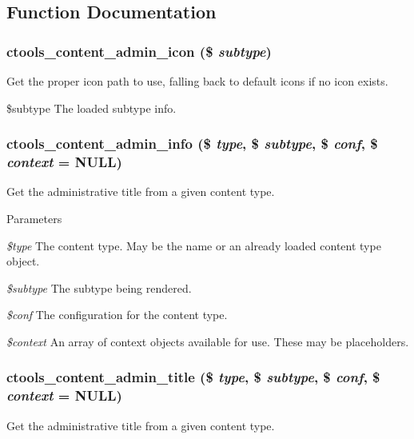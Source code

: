\subsection{Function Documentation}
\hypertarget{content_8inc_a8a34ea697f0793ce3d937ad6e80970ef}{
\subsubsection[{ctools\_\-content\_\-admin\_\-icon}]{\setlength{\rightskip}{0pt plus 5cm}ctools\_\-content\_\-admin\_\-icon (\$ {\em subtype})}}
\label{content_8inc_a8a34ea697f0793ce3d937ad6e80970ef}
Get the proper icon path to use, falling back to default icons if no icon exists.

\$subtype The loaded subtype info. \hypertarget{content_8inc_add05b7edd8612b6dfcea3eb5c7cea4cf}{
\subsubsection[{ctools\_\-content\_\-admin\_\-info}]{\setlength{\rightskip}{0pt plus 5cm}ctools\_\-content\_\-admin\_\-info (\$ {\em type}, \/  \$ {\em subtype}, \/  \$ {\em conf}, \/  \$ {\em context} = {\ttfamily NULL})}}
\label{content_8inc_add05b7edd8612b6dfcea3eb5c7cea4cf}
Get the administrative title from a given content type.


\begin{DoxyParams}{Parameters}
\item[{\em \$type}]The content type. May be the name or an already loaded content type object. \item[{\em \$subtype}]The subtype being rendered. \item[{\em \$conf}]The configuration for the content type. \item[{\em \$context}]An array of context objects available for use. These may be placeholders. \end{DoxyParams}
\hypertarget{content_8inc_aa2e438783f4289d5388c15061e93e0a2}{
\subsubsection[{ctools\_\-content\_\-admin\_\-title}]{\setlength{\rightskip}{0pt plus 5cm}ctools\_\-content\_\-admin\_\-title (\$ {\em type}, \/  \$ {\em subtype}, \/  \$ {\em conf}, \/  \$ {\em context} = {\ttfamily NULL})}}
\label{content_8inc_aa2e438783f4289d5388c15061e93e0a2}
Get the administrative title from a given content type.


